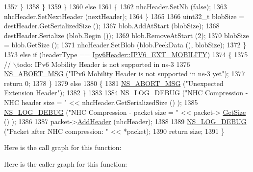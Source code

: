 \begin{DoxyCode}
1357                 \}
1358             \}
1359         \}
1360       \textcolor{keywordflow}{else}
1361         \{
1362           nhcHeader.SetNh (\textcolor{keyword}{false});
1363           nhcHeader.SetNextHeader (nextHeader);
1364         \}
1365 
1366       uint32\_t blobSize = destHeader.GetSerializedSize ();
1367       blob.AddAtStart (blobSize);
1368       destHeader.Serialize (blob.Begin ());
1369       blob.RemoveAtStart (2);
1370       blobSize = blob.GetSize ();
1371       nhcHeader.SetBlob (blob.PeekData (), blobSize);
1372     \}
1373   \textcolor{keywordflow}{else} \textcolor{keywordflow}{if} (headerType == \hyperlink{classns3_1_1Ipv6Header_a226429221a066c5e3b1f260caf27d1e9ac0c0affdd753b9d7593226d623f9d9dc}{Ipv6Header::IPV6\_EXT\_MOBILITY})
1374     \{
1375       \textcolor{comment}{// \(\backslash\)todo: IPv6 Mobility Header is not supported in ns-3}
1376       \hyperlink{group__fatal_ga51ac4699be799d772ae7258d1ef6af21}{NS\_ABORT\_MSG} (\textcolor{stringliteral}{"IPv6 Mobility Header is not supported in ns-3 yet"});
1377       \textcolor{keywordflow}{return} 0;
1378     \}
1379   \textcolor{keywordflow}{else}
1380     \{
1381       \hyperlink{group__fatal_ga51ac4699be799d772ae7258d1ef6af21}{NS\_ABORT\_MSG} (\textcolor{stringliteral}{"Unexpected Extension Header"});
1382     \}
1383 
1384   \hyperlink{group__logging_ga413f1886406d49f59a6a0a89b77b4d0a}{NS\_LOG\_DEBUG} (\textcolor{stringliteral}{"NHC Compression - NHC header size = "} << nhcHeader.GetSerializedSize () );
1385   \hyperlink{group__logging_ga413f1886406d49f59a6a0a89b77b4d0a}{NS\_LOG\_DEBUG} (\textcolor{stringliteral}{"NHC Compression - packet size = "} << packet->
      \hyperlink{classns3_1_1Packet_a462855c9929954d4301a4edfe55f4f1c}{GetSize} () );
1386 
1387   packet->\hyperlink{classns3_1_1Packet_a465108c595a0bc592095cbcab1832ed8}{AddHeader} (nhcHeader);
1388 
1389   \hyperlink{group__logging_ga413f1886406d49f59a6a0a89b77b4d0a}{NS\_LOG\_DEBUG} (\textcolor{stringliteral}{"Packet after NHC compression: "} << *packet);
1390   \textcolor{keywordflow}{return} size;
1391 \}
\end{DoxyCode}


Here is the call graph for this function\+:




Here is the caller graph for this function\+:


